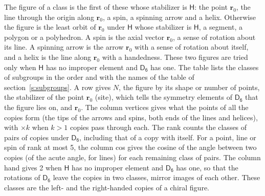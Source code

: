 \documentclass[10pt,a4paper]{article}
\numberwithin{equation}{section}
\newcommand{\grp}[1]{\mathsf{#1}}
\newcommand{\pointr}{\mathbf{r}}
\begin{document}
\leavevmode\label{n:head.figure}The figure of a class is the first of these whose stabilizer is $\grp{H}$: the point $\pointr_0$, the line through the origin along $\pointr_0$, a spin, a spinning arrow and a helix. Otherwise the figure is the least orbit of $\pointr_0$ under $\grp{H}$ whose stabilizer is $\grp{H}$, a segment, a polygon or a polyhedron. A spin is the axial vector $\pointr_0$, a sense of rotation about its line. A spinning arrow is the arrow $\pointr_0$ with a sense of rotation about itself, and a helix is the line along $\pointr_0$ with a handedness. These two figures are tried only when $\grp{H}$ has no improper element and $\grp{D_{6}}$ has one. The table lists the classes of subgroups in the order and with the names of the table of section~\ref{s:subgroups}. \label{n:head.site}A row gives $N$, the figure by its shape or number of points, the stabilizer of the point $\pointr_0$ (site), which tells the symmetry elements of $\grp{D_{6}}$ that the figure lies on, and $\pointr_0$. \label{n:head.vertices}The column vertices gives what the points of all the copies form (the tips of the arrows and spins, both ends of the lines and helices), with ${\times}k$ when $k > 1$ copies pass through each. \label{n:head.rank}The rank counts the classes of pairs of copies under $\grp{D_{6}}$, including that of a copy with itself. \label{n:head.cos}For a point, line or spin of rank at most 5, the column cos gives the cosine of the angle between two copies (of the acute angle, for lines) for each remaining class of pairs. \label{n:head.hand}The column hand gives 2 when $\grp{H}$ has no improper element and $\grp{D_{6}}$ has one, so that the rotations of $\grp{D_{6}}$ leave the copies in two classes, mirror images of each other. These classes are the left- and the right-handed copies of a chiral figure.
\end{document}
